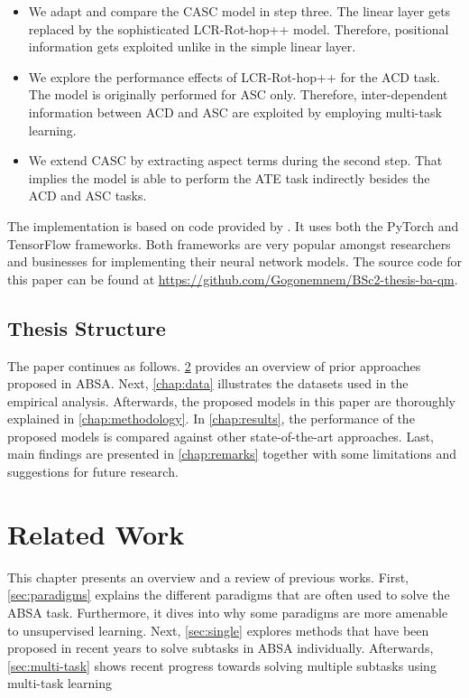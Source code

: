 \documentclass[american, oneside]{ecsgdp}
\begin{document}
\begin{itemize}
    \item We adapt and compare the CASC model in step three. The linear layer gets replaced by the sophisticated LCR-Rot-hop++ model. Therefore, positional information gets exploited unlike in the simple linear layer.
    \item We explore the performance effects of LCR-Rot-hop++ for the ACD task. The model is originally performed for ASC only. Therefore, inter-dependent information between ACD and ASC are exploited by employing multi-task learning.
    \item We extend CASC by extracting aspect terms during the second step. That implies the model is able to perform the ATE task indirectly besides the ACD and ASC tasks.
\end{itemize}

The implementation is based on code provided by \textcite{Kumar2021CASC}. It uses both the PyTorch and TensorFlow frameworks. Both frameworks are very popular amongst researchers and businesses for implementing their neural network models. The source code for this paper can be found at \url{https://github.com/Gogonemnem/BSc2-thesis-ba-qm}.

\section{Thesis Structure} \label{sec:structure}
The paper continues as follows. \cref{chap:related_work} provides an overview of prior approaches proposed in ABSA. Next, \cref{chap:data} illustrates the datasets used in the empirical analysis. Afterwards, the proposed models in this paper are thoroughly explained in \cref{chap:methodology}. In \cref{chap:results}, the performance of the proposed models is compared against other state-of-the-art approaches. Last, main findings are presented in \cref{chap:remarks} together with some limitations and suggestions for future research.

\chapter{Related Work} \label{chap:related_work}
This chapter presents an overview and a review of previous works. First, \cref{sec:paradigms} explains the different paradigms that are often used to solve the ABSA task. Furthermore, it dives into why some paradigms are more amenable to unsupervised learning. Next, \cref{sec:single} explores methods that have been proposed in recent years to solve subtasks in ABSA individually. Afterwards, \cref{sec:multi-task} shows recent progress towards solving multiple subtasks using multi-task learning 
\end{document}
